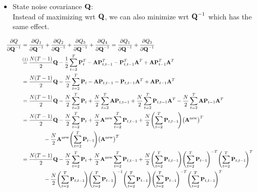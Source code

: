 	\begin{itemize}
		\item State noise covariance \(\boldsymbol{\mathrm{Q}}\): \\ Instead of maximizing \ac{wrt} \(\boldsymbol{\mathrm{Q}}\), we can also minimize \ac{wrt} \(\boldsymbol{\mathrm{Q}}^{-1}\) which has the same effect.
	\end{itemize}
	\begin{align}
		&&\pdv{Q}{\mat{Q}^{-1}}
			&= \pdv{Q_1}{\mat{Q}^{-1}} + \pdv{Q_2}{\mat{Q}^{-1}} + \pdv{Q_3}{\mat{Q}^{-1}} + \pdv{Q_4}{\mat{Q}^{-1}} = \pdv{Q_1}{\mat{Q}^{-1}} + \pdv{Q_3}{\mat{Q}^{-1}} & \nonumber \\
		&&	&\oversetfootnotemark{=} \frac{N(T - 1)}{2} \mat{Q} - \frac{1}{2} \sum_{t = 2}^{T} \mat{P}_t^T - \mat{A} \mat{P}_{t, t - 1}^T - \mat{P}_{t, t - 1}^T \mat{A}^T + \mat{A} \mat{P}_{t - 1}^T \mat{A}^T & \nonumber \\
		&&	&= \frac{N(T - 1)}{2} \mat{Q} - \frac{N}{2} \sum_{t = 2}^{T} \mat{P}_t - \mat{A} \mat{P}_{t, t - 1} - \mat{P}_{t, t - 1} \mat{A}^T + \mat{A} \mat{P}_{t - 1} \mat{A}^T & \nonumber \\
		&&	&= \frac{N(T - 1)}{2} \mat{Q} - \frac{N}{2} \sum_{t = 2}^{T} \mat{P}_t + \frac{N}{2} \sum_{t = 2}^{T} \mat{A} \mat{P}_{t, t - 1} + \frac{N}{2} \sum_{t = 2}^{T} \mat{P}_{t, t - 1} \mat{A}^T - \frac{N}{2} \sum_{t = 2}^{T} \mat{A} \mat{P}_{t - 1} \mat{A}^T & \nonumber \\
		&&	&= \frac{N(T - 1)}{2} \mat{Q} - \frac{N}{2} \sum_{t = 2}^{T} \mat{P}_t + \frac{N}{2} \mat{A}^\new \sum_{t = 2}^{T} \mat{P}_{t, t - 1} + \frac{N}{2} \Bigg(\! \sum_{t = 2}^{T} \mat{P}_{t, t - 1} \!\Bigg) \big(\mat{A}^\new\big)^T & \nonumber \\
			&&	&\qquad\qquad - \frac{N}{2} \mat{A}^\new \Bigg(\! \sum_{t = 2}^{T} \mat{P}_{t - 1} \!\Bigg) \big(\mat{A}^\new\big)^T & \nonumber \\
		&&	&= \frac{N(T - 1)}{2} \mat{Q} - \frac{N}{2} \sum_{t = 2}^{T} \mat{P}_t + \frac{N}{2} \mat{A}^\new \sum_{t = 2}^{T} \mat{P}_{t, t - 1} + \frac{N}{2} \Bigg(\! \sum_{t = 2}^{T} \mat{P}_{t, t - 1} \!\Bigg) \Bigg(\! \sum_{t = 2}^{T} \mat{P}_{t - 1} \!\Bigg)^{-T} \Bigg(\! \sum_{t = 2}^{T} \mat{P}_{t, t - 1} \!\Bigg)^T & \nonumber \\
			&&	&\qquad\qquad - \frac{N}{2} \Bigg(\! \sum_{t = 2}^{T} \mat{P}_{t, t - 1} \!\Bigg) \Bigg(\! \sum_{t = 2}^{T} \mat{P}_{t - 1} \!\Bigg)^{-1} \Bigg(\! \sum_{t = 2}^{T} \mat{P}_{t - 1} \!\Bigg) \Bigg(\! \sum_{t = 2}^{T} \mat{P}_{t - 1} \!\Bigg)^{-T} \Bigg(\! \sum_{t = 2}^{T} \mat{P}_{t, t - 1} \!\Bigg)^T & \nonumber \\

\end{align}

